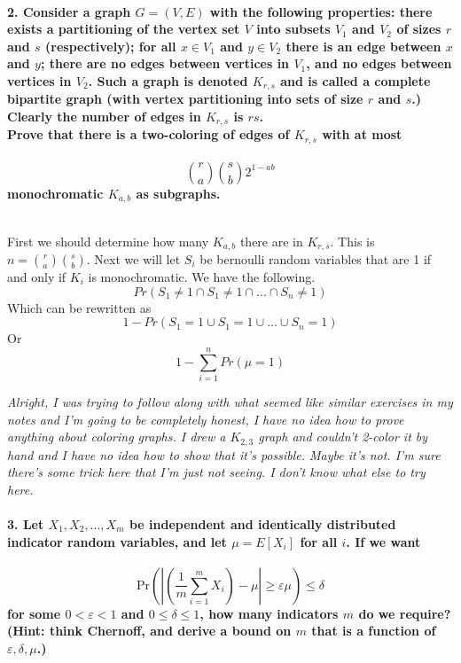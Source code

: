 \documentclass{article}
\begin{document}
\paragraph{2. Consider a graph $G = (V, E)$ with the following properties: 
there exists a partitioning of the vertex set $V$ into subsets $V_1$ and $V_2$ 
of sizes $r$ and $s$ (respectively); for all $x \in V_1$ and $y \in V_2$ there 
is an edge between $x$ and $y$; there are no edges between vertices in $V_1$, 
and no edges between vertices in $V_2$. Such a graph is denoted $K_{r,s}$ and 
is called a complete bipartite graph (with vertex partitioning into sets of 
size $r$ and $s$.) Clearly the number of edges in $K_{r,s}$ is $rs$.\\
Prove that there is a two-coloring of edges of $K_{r,s}$ with at most}
\begin{equation*}
{r\choose a}{s\choose b}2^{1-ab}
\end{equation*}
\textbf{monochromatic $K_{a,b}$ as subgraphs.\\\\}

First we should determine how many $K_{a,b}$ there are in $K_{r,s}$. This
is $n={r\choose a}{s\choose b}$. Next we will let $S_i$ be bernoulli random 
variables
that are 1 if and only if $K_i$ is monochromatic. We have the following.
\begin{equation*}
Pr(S_1\neq1 \cap S_1\neq1 \cap ... \cap S_n\neq1)
\end{equation*}
Which can be rewritten as
\begin{equation*}
1-Pr(S_1=1 \cup S_1=1 \cup ... \cup S_n=1)
\end{equation*}
Or
\begin{equation*}
1-\sum_{i=1}^n Pr(\mu=1)
\end{equation*}

\emph{Alright, I was trying to follow along with what seemed like similar
exercises in my notes and I'm going to be completely honest, I have no idea
how to prove anything about coloring graphs. I drew a $K_{2,3}$ graph and 
couldn't
2-color it by hand and I have no idea how to show that it's possible. Maybe it's
not. I'm sure there's some trick here that I'm just not seeing. I don't know
what else to try here.}


\pagebreak

\paragraph{3. Let $X_1,X_2,...,X_m$ be independent and identically distributed 
indicator random variables, and let $\mu = E[X_i]$ for all $i$. If we want}
\begin{equation*}
\mbox{Pr}\left(\left|\left(\frac{1}{m}\sum_{i=1}^m X_i\right)-\mu\right| \geq 
\varepsilon\mu \right) \leq \delta
\end{equation*}
\textbf{for some $0 < \varepsilon < 1$ and $0 \leq \delta \leq 1$, how many 
indicators $m$ do we require? (Hint: think Chernoff, and derive a bound on $m$ 
that is a function of $\varepsilon, \delta, \mu$.)\\\\}
\end{document}
